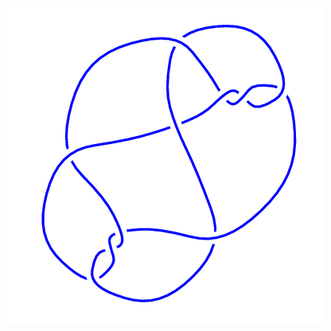 \begin{figure}[H]
\begin{minipage}[b]{.18\linewidth}
    \end{minipage}
    \begin{minipage}[b]{.18\linewidth}
        \centering
        \includegraphics[width=\linewidth]{../data/10_26.png}
    \end{minipage}
\end{figure}
